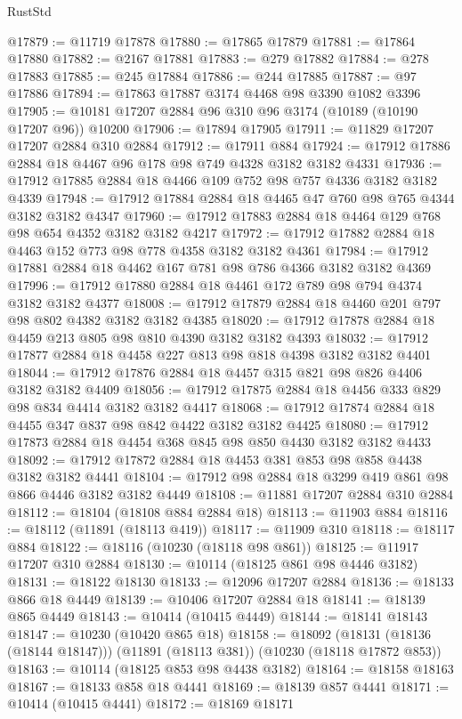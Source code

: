 \begin{lexlean}{RustStd}
\begin{coremodule}
@17879 := @11719 @17878
@17880 := @17865 @17879
@17881 := @17864 @17880
@17882 := @2167 @17881
@17883 := @279 @17882
@17884 := @278 @17883
@17885 := @245 @17884
@17886 := @244 @17885
@17887 := @97 @17886
@17894 := @17863 @17887 @3174 @4468 @98 @3390 @1082 @3396
@17905 := @10181 @17207 @2884 @96 @310 @96 @3174 (@10189 (@10190 @17207 @96)) @10200
@17906 := @17894 @17905
@17911 := @11829 @17207 @17207 @2884 @310 @2884
@17912 := @17911 @884
@17924 := @17912 @17886 @2884 @18 @4467 @96 @178 @98 @749 @4328 @3182 @3182 @4331
@17936 := @17912 @17885 @2884 @18 @4466 @109 @752 @98 @757 @4336 @3182 @3182 @4339
@17948 := @17912 @17884 @2884 @18 @4465 @47 @760 @98 @765 @4344 @3182 @3182 @4347
@17960 := @17912 @17883 @2884 @18 @4464 @129 @768 @98 @654 @4352 @3182 @3182 @4217
@17972 := @17912 @17882 @2884 @18 @4463 @152 @773 @98 @778 @4358 @3182 @3182 @4361
@17984 := @17912 @17881 @2884 @18 @4462 @167 @781 @98 @786 @4366 @3182 @3182 @4369
@17996 := @17912 @17880 @2884 @18 @4461 @172 @789 @98 @794 @4374 @3182 @3182 @4377
@18008 := @17912 @17879 @2884 @18 @4460 @201 @797 @98 @802 @4382 @3182 @3182 @4385
@18020 := @17912 @17878 @2884 @18 @4459 @213 @805 @98 @810 @4390 @3182 @3182 @4393
@18032 := @17912 @17877 @2884 @18 @4458 @227 @813 @98 @818 @4398 @3182 @3182 @4401
@18044 := @17912 @17876 @2884 @18 @4457 @315 @821 @98 @826 @4406 @3182 @3182 @4409
@18056 := @17912 @17875 @2884 @18 @4456 @333 @829 @98 @834 @4414 @3182 @3182 @4417
@18068 := @17912 @17874 @2884 @18 @4455 @347 @837 @98 @842 @4422 @3182 @3182 @4425
@18080 := @17912 @17873 @2884 @18 @4454 @368 @845 @98 @850 @4430 @3182 @3182 @4433
@18092 := @17912 @17872 @2884 @18 @4453 @381 @853 @98 @858 @4438 @3182 @3182 @4441
@18104 := @17912 @98 @2884 @18 @3299 @419 @861 @98 @866 @4446 @3182 @3182 @4449
@18108 := @11881 @17207 @2884 @310 @2884
@18112 := @18104 (@18108 @884 @2884 @18)
@18113 := @11903 @884
@18116 := @18112 (@11891 (@18113 @419))
@18117 := @11909 @310
@18118 := @18117 @884
@18122 := @18116 (@10230 (@18118 @98 @861))
@18125 := @11917 @17207 @310 @2884
@18130 := @10114 (@18125 @861 @98 @4446 @3182)
@18131 := @18122 @18130
@18133 := @12096 @17207 @2884
@18136 := @18133 @866 @18 @4449
@18139 := @10406 @17207 @2884 @18
@18141 := @18139 @865 @4449
@18143 := @10414 (@10415 @4449)
@18144 := @18141 @18143
@18147 := @10230 (@10420 @865 @18)
@18158 := @18092
    (@18131 (@18136 (@18144 @18147)))
    (@11891 (@18113 @381))
    (@10230 (@18118 @17872 @853))
@18163 := @10114 (@18125 @853 @98 @4438 @3182)
@18164 := @18158 @18163
@18167 := @18133 @858 @18 @4441
@18169 := @18139 @857 @4441
@18171 := @10414 (@10415 @4441)
@18172 := @18169 @18171

\end{coremodule}
\end{lexlean}
